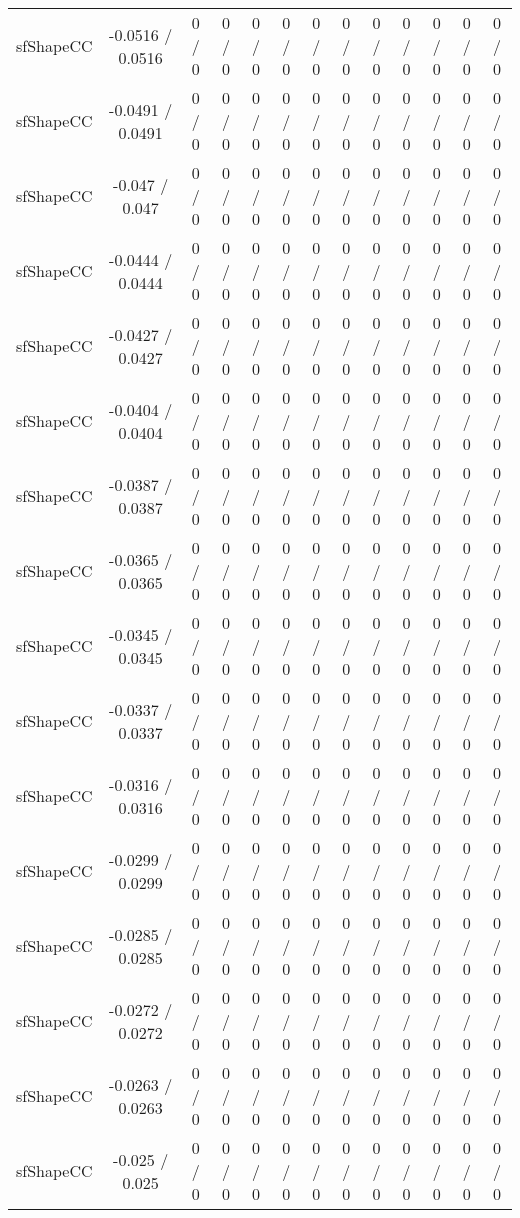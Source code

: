 \documentclass[10pt]{article}
\begin{document}
\begin{table}[htbp]
\begin{center}
\begin{tabular}{|c|c|c|c|c|c|c|c|c|c|c|c|c|}
  sfShapeCC & -0.0516 / 0.0516 & 0 / 0 & 0 / 0 & 0 / 0 & 0 / 0 & 0 / 0 & 0 / 0 & 0 / 0 & 0 / 0 & 0 / 0 & 0 / 0 & 0 / 0 \\ 
  sfShapeCC & -0.0491 / 0.0491 & 0 / 0 & 0 / 0 & 0 / 0 & 0 / 0 & 0 / 0 & 0 / 0 & 0 / 0 & 0 / 0 & 0 / 0 & 0 / 0 & 0 / 0 \\ 
  sfShapeCC & -0.047 / 0.047 & 0 / 0 & 0 / 0 & 0 / 0 & 0 / 0 & 0 / 0 & 0 / 0 & 0 / 0 & 0 / 0 & 0 / 0 & 0 / 0 & 0 / 0 \\ 
  sfShapeCC & -0.0444 / 0.0444 & 0 / 0 & 0 / 0 & 0 / 0 & 0 / 0 & 0 / 0 & 0 / 0 & 0 / 0 & 0 / 0 & 0 / 0 & 0 / 0 & 0 / 0 \\ 
  sfShapeCC & -0.0427 / 0.0427 & 0 / 0 & 0 / 0 & 0 / 0 & 0 / 0 & 0 / 0 & 0 / 0 & 0 / 0 & 0 / 0 & 0 / 0 & 0 / 0 & 0 / 0 \\ 
  sfShapeCC & -0.0404 / 0.0404 & 0 / 0 & 0 / 0 & 0 / 0 & 0 / 0 & 0 / 0 & 0 / 0 & 0 / 0 & 0 / 0 & 0 / 0 & 0 / 0 & 0 / 0 \\ 
  sfShapeCC & -0.0387 / 0.0387 & 0 / 0 & 0 / 0 & 0 / 0 & 0 / 0 & 0 / 0 & 0 / 0 & 0 / 0 & 0 / 0 & 0 / 0 & 0 / 0 & 0 / 0 \\ 
  sfShapeCC & -0.0365 / 0.0365 & 0 / 0 & 0 / 0 & 0 / 0 & 0 / 0 & 0 / 0 & 0 / 0 & 0 / 0 & 0 / 0 & 0 / 0 & 0 / 0 & 0 / 0 \\ 
  sfShapeCC & -0.0345 / 0.0345 & 0 / 0 & 0 / 0 & 0 / 0 & 0 / 0 & 0 / 0 & 0 / 0 & 0 / 0 & 0 / 0 & 0 / 0 & 0 / 0 & 0 / 0 \\ 
  sfShapeCC & -0.0337 / 0.0337 & 0 / 0 & 0 / 0 & 0 / 0 & 0 / 0 & 0 / 0 & 0 / 0 & 0 / 0 & 0 / 0 & 0 / 0 & 0 / 0 & 0 / 0 \\ 
  sfShapeCC & -0.0316 / 0.0316 & 0 / 0 & 0 / 0 & 0 / 0 & 0 / 0 & 0 / 0 & 0 / 0 & 0 / 0 & 0 / 0 & 0 / 0 & 0 / 0 & 0 / 0 \\ 
  sfShapeCC & -0.0299 / 0.0299 & 0 / 0 & 0 / 0 & 0 / 0 & 0 / 0 & 0 / 0 & 0 / 0 & 0 / 0 & 0 / 0 & 0 / 0 & 0 / 0 & 0 / 0 \\ 
  sfShapeCC & -0.0285 / 0.0285 & 0 / 0 & 0 / 0 & 0 / 0 & 0 / 0 & 0 / 0 & 0 / 0 & 0 / 0 & 0 / 0 & 0 / 0 & 0 / 0 & 0 / 0 \\ 
  sfShapeCC & -0.0272 / 0.0272 & 0 / 0 & 0 / 0 & 0 / 0 & 0 / 0 & 0 / 0 & 0 / 0 & 0 / 0 & 0 / 0 & 0 / 0 & 0 / 0 & 0 / 0 \\ 
  sfShapeCC & -0.0263 / 0.0263 & 0 / 0 & 0 / 0 & 0 / 0 & 0 / 0 & 0 / 0 & 0 / 0 & 0 / 0 & 0 / 0 & 0 / 0 & 0 / 0 & 0 / 0 \\ 
  sfShapeCC & -0.025 / 0.025 & 0 / 0 & 0 / 0 & 0 / 0 & 0 / 0 & 0 / 0 & 0 / 0 & 0 / 0 & 0 / 0 & 0 / 0 & 0 / 0 & 0 / 0 \\ 

\end{tabular}
\end{center}
\end{table}
\end{document}
